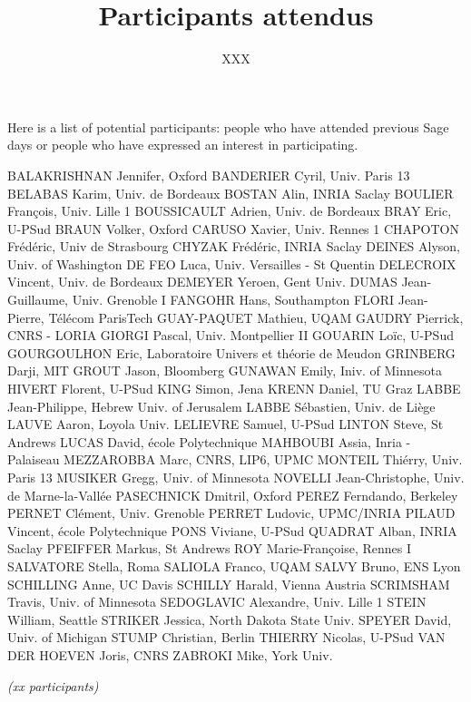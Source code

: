 \documentclass{paper}
\title{Participants attendus}
\subtitle{XXX}
\date{}
\begin{document}
\maketitle
\thispagestyle{empty}

Here is a list of potential participants: people who have attended previous Sage days 
or people who have expressed an interest in participating. 

\bigskip

\obeylines
BALAKRISHNAN Jennifer, Oxford 
BANDERIER Cyril, Univ. Paris 13
BELABAS Karim, Univ. de Bordeaux
BOSTAN Alin, INRIA Saclay
BOULIER François, Univ. Lille 1
BOUSSICAULT Adrien, Univ. de Bordeaux
BRAY Eric, U-PSud
BRAUN Volker, Oxford
CARUSO Xavier, Univ. Rennes 1
CHAPOTON Frédéric, Univ de Strasbourg
CHYZAK Frédéric, INRIA Saclay
DEINES Alyson, Univ. of Washington
DE FEO Luca, Univ. Versailles - St Quentin
DELECROIX Vincent, Univ. de Bordeaux
DEMEYER Yeroen, Gent Univ.
DUMAS Jean-Guillaume, Univ. Grenoble I
FANGOHR Hans, Southampton
FLORI Jean-Pierre, Télécom ParisTech
GUAY-PAQUET Mathieu, UQAM
GAUDRY Pierrick, CNRS - LORIA
GIORGI Pascal, Univ. Montpellier II
GOUARIN Loïc, U-PSud
GOURGOULHON Eric, Laboratoire Univers et théorie de Meudon
GRINBERG Darji, MIT
GROUT Jason, Bloomberg
GUNAWAN Emily, Iniv. of Minnesota
HIVERT Florent, U-PSud
KING Simon, Jena
KRENN Daniel, TU Graz
LABBE Jean-Philippe, Hebrew Univ. of Jerusalem
LABBE Sébastien, Univ. de Liège
LAUVE Aaron, Loyola Univ.
LELIEVRE Samuel, U-PSud
LINTON Steve, St Andrews
LUCAS David, école Polytechnique
MAHBOUBI Assia, Inria - Palaiseau
MEZZAROBBA Marc, CNRS, LIP6, UPMC
MONTEIL Thiérry, Univ. Paris 13
MUSIKER Gregg, Univ. of Minnesota
NOVELLI Jean-Christophe, Univ. de Marne-la-Vallée
PASECHNICK Dmitril, Oxford
PEREZ Ferndando, Berkeley
PERNET Clément, Univ. Grenoble
PERRET Ludovic, UPMC/INRIA
PILAUD Vincent, école Polytechnique
PONS Viviane, U-PSud
QUADRAT Alban, INRIA Saclay
PFEIFFER Markus, St Andrews
ROY Marie-Françoise, Rennes I
SALVATORE Stella, Roma
SALIOLA Franco, UQAM
SALVY Bruno, ENS Lyon
SCHILLING Anne, UC Davis
SCHILLY Harald, Vienna Austria
SCRIMSHAM Travis, Univ. of Minnesota
SEDOGLAVIC Alexandre, Univ. Lille 1
STEIN William, Seattle
STRIKER Jessica, North Dakota State Univ.
SPEYER David, Univ. of Michigan
STUMP Christian, Berlin
THIERRY Nicolas, U-PSud
VAN DER HOEVEN Joris, CNRS
ZABROKI Mike, York Univ.

\medskip
\emph{(xx participants)}
\end{document}
